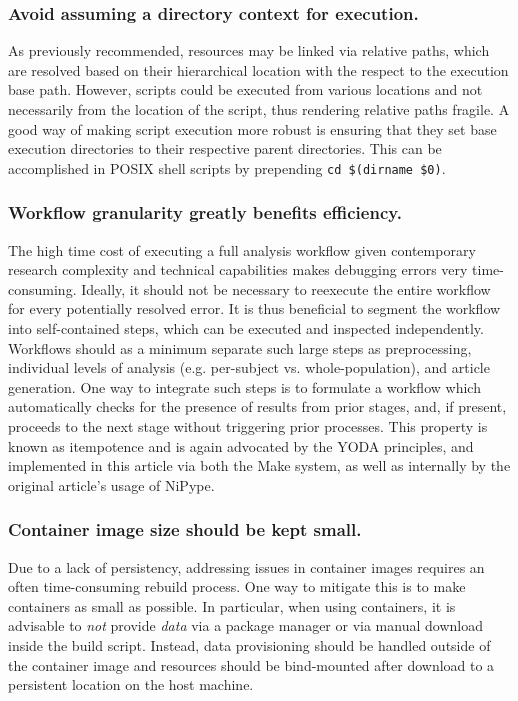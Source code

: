 \subsubsection{Avoid assuming a directory context for execution.}
As previously recommended, resources may be linked via relative paths, which are resolved based on their hierarchical location with the respect to the execution base path.
However, scripts could be executed from various locations and not necessarily from the location of the script, thus rendering relative paths fragile.
A good way of making script execution more robust is ensuring that they set base execution directories to their respective parent directories.
This can be accomplished in POSIX shell scripts by prepending \texttt{cd \textquotedbl\$(dirname \textquotedbl\$0\textquotedbl)\textquotedbl}.

\subsubsection{Workflow granularity greatly benefits efficiency.}
The high time cost of executing a full analysis workflow given contemporary research complexity and technical capabilities makes debugging errors very time-consuming.
Ideally, it should not be necessary to reexecute the entire workflow for every potentially resolved error.
It is thus beneficial to segment the workflow into self-contained steps, which can be executed and inspected independently.
Workflows should as a minimum separate such large steps as preprocessing, individual levels of analysis (e.g. per-subject vs. whole-population), and article generation.
One way to integrate such steps is to formulate a workflow which automatically checks for the presence of results from prior stages, and, if present, proceeds to the next stage without triggering prior processes.
This property is known as itempotence and is again advocated by the YODA principles, and implemented in this article via both the Make system, as well as internally by the original article's usage of NiPype.

\subsubsection{Container image size should be kept small.}
Due to a lack of persistency, addressing issues in container images requires an often time-consuming rebuild process.
One way to mitigate this is to make containers as small as possible.
In particular, when using containers, it is advisable to \textit{not} provide \textit{data} via a package manager or via manual download inside the build script.
Instead, data provisioning should be handled outside of the container image and resources should be bind-mounted after download to a persistent location on the host machine.

